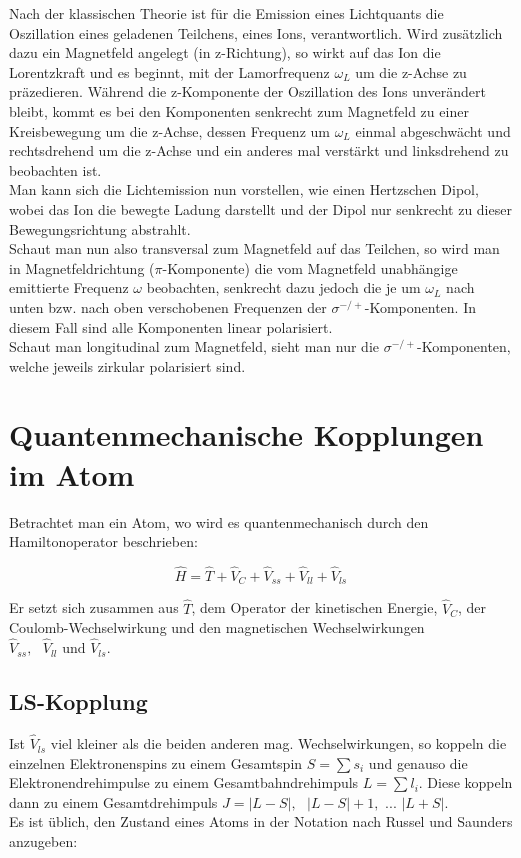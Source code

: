 \documentclass[bigchapter,colorback,accentcolor=tud4b,linedtoc,11pt]{tudreport}
\begin{document}
Nach der klassischen Theorie ist für die Emission eines Lichtquants
die Oszillation eines geladenen Teilchens, eines Ions, verantwortlich.
Wird zusätzlich dazu ein Magnetfeld angelegt (in z-Richtung), so wirkt
auf das Ion die Lorentzkraft und es beginnt, mit der Lamorfrequenz
$\omega_{L}$ um die z-Achse zu präzedieren. Während die z-Komponente
der Oszillation des Ions unverändert bleibt, kommt es bei den Komponenten
senkrecht zum Magnetfeld zu einer Kreisbewegung um die z-Achse, dessen
Frequenz um $\omega_{L}$ einmal abgeschwächt und rechtsdrehend um
die z-Achse und ein anderes mal verstärkt und linksdrehend zu beobachten
ist. \\
Man kann sich die Lichtemission nun vorstellen, wie einen Hertzschen
Dipol, wobei das Ion die bewegte Ladung darstellt und der Dipol nur
senkrecht zu dieser Bewegungsrichtung abstrahlt. \\
Schaut man nun also transversal zum Magnetfeld auf das Teilchen, so
wird man in Magnetfeldrichtung ($\pi$-Komponente) die vom Magnetfeld
unabhängige emittierte Frequenz $\omega$ beobachten, senkrecht dazu
jedoch die je um $\omega_{L}$ nach unten bzw. nach oben verschobenen
Frequenzen der $\sigma^{-/+}$-Komponenten. In diesem Fall sind alle
Komponenten linear polarisiert. \\
Schaut man longitudinal zum Magnetfeld, sieht man nur die $\sigma^{-/+}$-Komponenten,
welche jeweils zirkular polarisiert sind. 


\section{Quantenmechanische Kopplungen im Atom}

Betrachtet man ein Atom, wo wird es quantenmechanisch durch den Hamiltonoperator
beschrieben:

$$\hat{H}=\hat{T}+\hat{V}_{C}+\hat{V}_{ss}+\hat{V}_{ll}+\hat{V}_{ls}$$

Er setzt sich zusammen aus $\hat{T}$, dem Operator der kinetischen
Energie, $\hat{V}_{C}$, der Coulomb-Wechselwirkung und den magnetischen
Wechselwirkungen $\hat{V}_{ss},\mbox{ }\hat{V}_{ll}\mbox{ und }\hat{V}_{ls}$.


\subsection{LS-Kopplung}

Ist $\hat{V}_{ls}$ viel kleiner als die beiden anderen mag. Wechselwirkungen,
so koppeln die einzelnen Elektronenspins zu einem Gesamtspin $S=\sum s_{i}$
und genauso die Elektronendrehimpulse zu einem Gesamtbahndrehimpuls
$L=\sum l_{i}$. Diese koppeln dann zu einem Gesamtdrehimpuls $J=\left|L-S\right|,\mbox{ }\left|L-S\right|+1,\mbox{ ... }\left|L+S\right|$.\\
Es ist üblich, den Zustand eines Atoms in der Notation nach Russel
und Saunders anzugeben:
\end{document}

